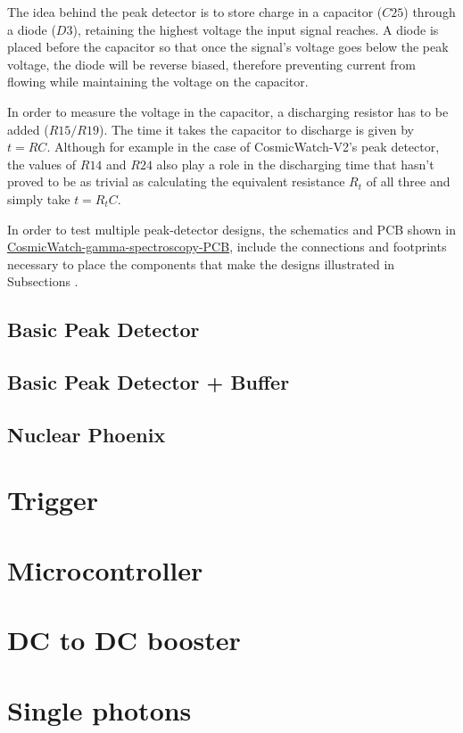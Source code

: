 The idea behind the peak detector is to store charge in a capacitor ($C25$) through a diode ($D3$), retaining the highest voltage the input signal reaches. A diode is placed before the capacitor so that once the signal's voltage goes below the peak voltage, the diode will be reverse biased, therefore preventing current from flowing while maintaining the voltage on the capacitor.

In order to measure the voltage in the capacitor, a discharging resistor has to be added ($R15/R19$). The time it takes the capacitor to discharge is given by $t=RC$. Although for example in the case of CosmicWatch-V2's peak detector, the values of $R14$ and $R24$ also play a role in the discharging time that hasn't proved to be as trivial as calculating the equivalent resistance $R_t$ of all three and simply take $t=R_tC$.

In order to test multiple peak-detector designs, the schematics and PCB shown in \href{https://github.com/anvargasl/CosmicWatch-gamma-spectroscopy-PCB}{CosmicWatch-gamma-spectroscopy-PCB}, include the connections and footprints necessary to place the components that make the designs illustrated in Subsections .

\subsection{Basic Peak Detector}\label{sec:basic}

\subsection{Basic Peak Detector + Buffer}\label{sec:basic_buffer}

\subsection{Nuclear Phoenix}\label{sec:nuclear_phoenix}

\cite{Nucelar_phoenix}

\section{Trigger}

\section{Microcontroller}

\section{DC to DC booster}

\section{Single photons}